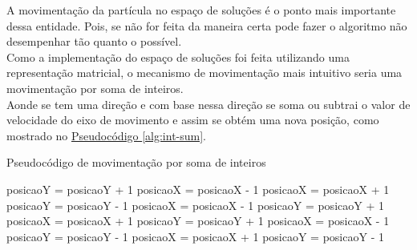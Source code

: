 %
\indent A movimentação da partícula no espaço de soluções é o ponto mais importante dessa entidade. Pois, se não for feita da maneira certa pode fazer o algoritmo não desempenhar tão quanto o possível.\\
\indent Como a implementação do espaço de soluções foi feita utilizando uma representação matricial, o mecanismo de movimentação mais intuitivo seria uma movimentação por soma de inteiros.\\
\indent Aonde se tem uma direção e com base nessa direção se soma ou subtrai o valor de velocidade do eixo de movimento e assim se obtém uma nova posição, como mostrado no \hyperref[alg:int-sum]{Pseudocódigo \ref{alg:int-sum}}.
\begin{algorithm}
    \caption{Pseudocódigo de movimentação por soma de inteiros}\label{alg:int-sum}
\begin{algorithmic}
  \State posicaoY = posicaoY + 1
  \State posicaoX = posicaoX - 1
  \State posicaoX = posicaoX + 1
  \State posicaoY = posicaoY - 1
  \State posicaoX = posicaoX - 1
  \State posicaoY = posicaoY + 1
  \State posicaoX = posicaoX + 1
  \State posicaoY = posicaoY + 1
  \State posicaoX = posicaoX - 1
  \State posicaoY = posicaoY - 1
  \State posicaoX = posicaoX + 1
  \State posicaoY = posicaoY - 1
\EndIf    

\end{algorithmic}
\end{algorithm}

